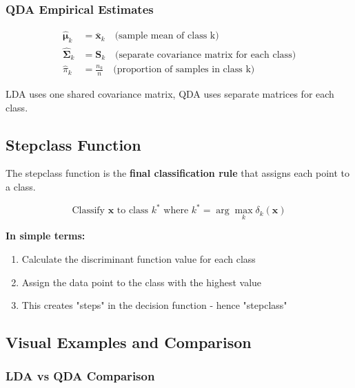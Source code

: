 \documentclass[12pt,a4paper]{article}
\begin{document}
\subsubsection{QDA Empirical Estimates}

\begin{align}
\hat{\boldsymbol{\mu}}_k &= \bar{\mathbf{x}}_k \quad \text{(sample mean of class k)} \\
\hat{\boldsymbol{\Sigma}}_k &= \mathbf{S}_k \quad \text{(separate covariance matrix for each class)} \\
\hat{\pi}_k &= \frac{n_k}{n} \quad \text{(proportion of samples in class k)}
\end{align}

\begin{tcolorbox}[colback=red!5!white,colframe=red!75!black,title=Key Difference]
LDA uses one shared covariance matrix, QDA uses separate matrices for each class.
\end{tcolorbox}

\subsection{Stepclass Function}

The stepclass function is the \textbf{final classification rule} that assigns each point to a class.

\begin{equation}
\text{Classify } \mathbf{x} \text{ to class } k^* \text{ where } k^* = \arg\max_k \delta_k(\mathbf{x})
\end{equation}

\textbf{In simple terms:}
\begin{enumerate}
    \item Calculate the discriminant function value for each class
    \item Assign the data point to the class with the highest value
    \item This creates "steps" in the decision function - hence "stepclass"
\end{enumerate}

\subsection{Visual Examples and Comparison}

\subsubsection{LDA vs QDA Comparison}
\end{document}
